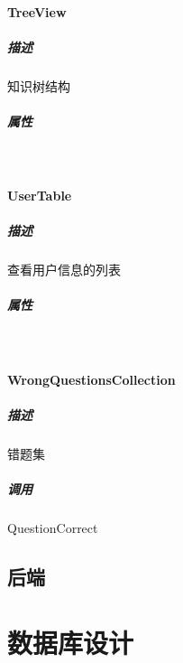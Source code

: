 \documentclass{article}
\begin{document}
        \paragraph{TreeView}
            \subparagraph{描述}
                知识树结构
            \subparagraph{属性}\ \par
                
        \paragraph{UserTable}
            \subparagraph{描述}
                查看用户信息的列表
            \subparagraph{属性}\ \par
                
        \paragraph{WrongQuestionsCollection}
            \subparagraph{描述}
                错题集
            \subparagraph{调用}
                QuestionCorrect
    \subsection{后端}
    
\section{数据库设计}
\end{document}
